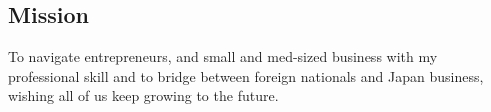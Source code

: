 \subsection{Mission}
To navigate entrepreneurs, and  small and med-sized business with my professional skill and to bridge between foreign nationals and Japan business, wishing all of us keep growing to the future. 







